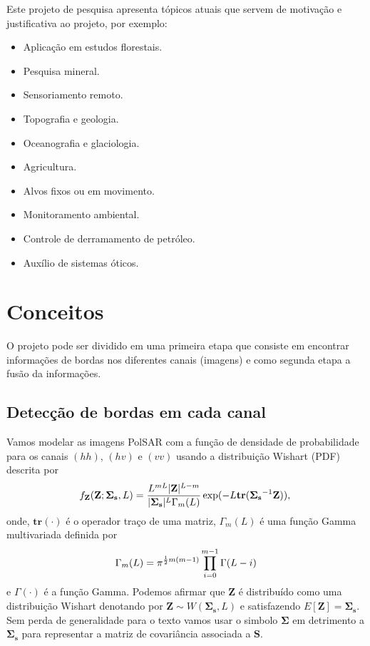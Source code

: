 \documentclass[runningheads]{llncs}
\begin{document}
Este projeto de pesquisa apresenta tópicos atuais que servem de motivação e justificativa ao projeto, por exemplo:
\begin{itemize}
\item Aplicação em estudos florestais.
\item Pesquisa mineral.
\item Sensoriamento remoto.
\item Topografia e geologia.
\item Oceanografia e glaciologia.
\item Agricultura.
\item Alvos fixos ou em movimento.
\item Monitoramento ambiental.
\item Controle de derramamento de petróleo.
\item Auxílio de sistemas óticos.
\end{itemize}

\section{Conceitos}
O projeto pode ser dividido em uma primeira etapa que consiste em encontrar informações de bordas nos diferentes canais (imagens) e como segunda etapa a fusão da informações. 
\subsection{Detecção de bordas em cada canal}
 Vamos modelar as imagens PolSAR com a função de densidade de probabilidade para os canais $(hh)$, $(hv)$ e $(vv)$ usando a distribuição Wishart (PDF) descrita por
\begin{equation}
    f_{\mathbf{Z}}(\mathbf{Z};\mathbf{\Sigma_{s}},L)=\frac{L^{mL}|\mathbf{Z}|^{L-m}}{|\mathbf{\Sigma_{s}}|^{L}\Gamma_m(L)} \exp(-L\mathbf{tr}(\mathbf{\Sigma_{s}}^{-1}\mathbf{Z})), \\
\end{equation} 
onde, $\mathbf{tr}(\cdot)$ é o operador traço de uma matriz, $\Gamma_m(L)$ é uma função Gamma multivariada definida por
\begin{equation}\label{cap_acf_10}
	\Gamma_m(L)=\pi^{\frac{1}{2}m(m-1)} \prod_{i=0}^{m-1}\Gamma(L-i) \\
\end{equation}
e $\Gamma(\cdot)$ é a função Gamma. Podemos afirmar que $\mathbf{Z}$ é distribuído como uma distribuição Wishart denotando por $\mathbf{Z}\sim W(\mathbf{\Sigma_{s}}, L)$ e satisfazendo $E[\mathbf{Z}]=\mathbf{\Sigma_{s}}$. Sem perda de generalidade para o texto vamos usar o simbolo $\mathbf{\Sigma}$ em detrimento a $\mathbf{\Sigma_{s}}$ para representar a matriz de covariância associada a $\mathbf{S}$.
 
\end{document}
